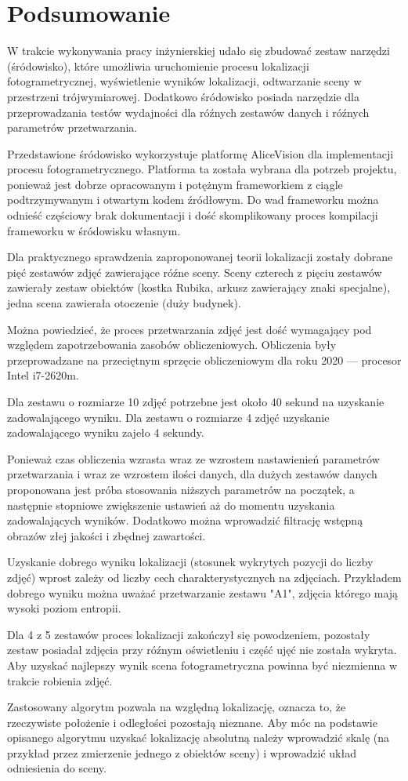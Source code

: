 \chapter{Podsumowanie}

W trakcie wykonywania pracy inżynierskiej udało się zbudować zestaw narzędzi (śródowisko), które umożliwia uruchomienie procesu lokalizacji fotogrametrycznej, wyświetlenie wyników lokalizacji, odtwarzanie sceny w przestrzeni trójwymiarowej. Dodatkowo śródowisko posiada narzędzie dla przeprowadzania testów wydajności dla róźnych zestawów danych i róźnych parametrów przetwarzania.

Przedstawione śródowisko wykorzystuje platformę AliceVision dla implementacji procesu fotogrametrycznego.
Platforma ta została wybrana dla potrzeb projektu, ponieważ jest dobrze opracowanym i potężnym frameworkiem z ciągle podtrzymywanym i otwartym kodem źródłowym.
Do wad frameworku można odnieść częściowy brak dokumentacji i dość skomplikowany proces kompilacji frameworku w śródowisku własnym.

Dla praktycznego sprawdzenia zaproponowanej teorii lokalizacji zostały dobrane pięć zestawów zdjęć zawierające róźne sceny.
Sceny czterech z pięciu zestawów zawierały zestaw obiektów (kostka Rubika, arkusz zawierający znaki specjalne), jedna scena zawierała otoczenie (duży budynek).


Można powiedzieć, że proces przetwarzania zdjęć jest dość wymagający pod względem zapotrzebowania zasobów obliczeniowych.
Obliczenia były przeprowadzane na przeciętnym sprzęcie obliczeniowym dla roku 2020 --- procesor Intel i7-2620m.

Dla zestawu o rozmiarze 10 zdjęć potrzebne jest około 40 sekund na uzyskanie zadowalającego wyniku.
Dla zestawu o rozmiarze 4 zdjęć uzyskanie zadowalającego wyniku zajeło 4 sekundy.

Ponieważ czas obliczenia wzrasta wraz ze wzrostem nastawienień parametrów przetwarzania i wraz ze wzrostem ilości danych, dla dużych zestawów danych proponowana jest próba stosowania niższych parametrów na początek, a następnie stopniowe zwiększenie ustawień aż do momentu uzyskania zadowalających wyników. Dodatkowo można wprowadzić filtrację wstępną obrazów złej jakości i zbędnej zawartości.

Uzyskanie dobrego wyniku lokalizacji (stosunek wykrytych pozycji do liczby zdjęć) wprost zależy od liczby cech charakterystycznych na zdjęciach.
Przykładem dobrego wyniku można uważać przetwarzanie zestawu "A1", zdjęcia którego mają wysoki poziom entropii.


Dla 4 z 5 zestawów proces lokalizacji zakończył się powodzeniem, pozostały zestaw posiadał zdjęcia przy róźnym oświetleniu i część ujęć nie została wykryta. Aby uzyskać najlepszy wynik scena fotogrametryczna powinna być niezmienna w trakcie robienia zdjęć.

Zastosowany algorytm pozwala na względną lokalizację, oznacza to, że rzeczywiste położenie i odległości pozostają nieznane. Aby móc na podstawie opisanego algorytmu uzyskać lokalizację absolutną należy wprowadzić skalę (na przykład przez zmierzenie jednego z obiektów sceny) i wprowadzić układ odniesienia do sceny.
